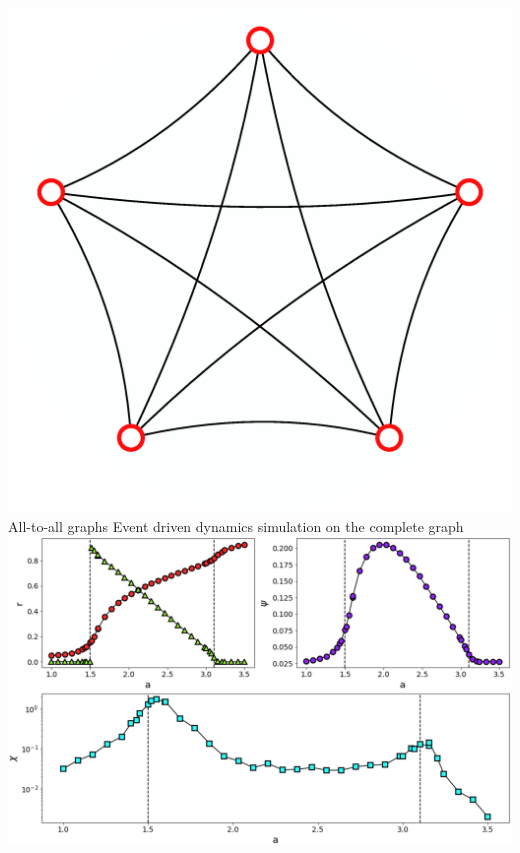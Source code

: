 \documentclass[serif,mathserif]{beamer}
\begin{document}
\begin{frame}{\includegraphics[height=0.06\textheight]{ring-complete-thumb.eps}\hspace{0.25cm} All-to-all graphs}
    \centering
    Event driven dynamics simulation on the complete graph\\
    \vspace{0.4cm}
    \includegraphics[width=\textwidth]{complete_graph.eps}
\end{frame}
\end{document}
